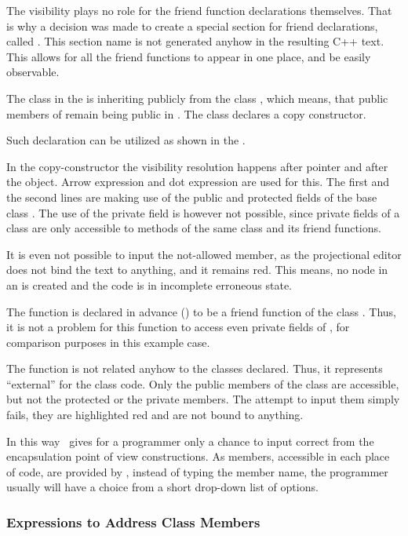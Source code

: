 The visibility plays no role for the friend function 
declarations themselves. That is why a decision was made to create a special 
section for friend declarations, called . This section name is not generated anyhow in the 
resulting C++ text. This allows for all the friend functions to appear in one place, 
and be easily observable.

The class  in the  is inheriting publicly from the class , which means,
that public members of  remain being public in . The class  declares
a copy constructor.

Such declaration can be utilized as shown in the .


In the copy-constructor the visibility resolution happens after  pointer
and after the  object. Arrow expression and dot expression are used for
this. The first and the second lines are making use of the public and protected fields of 
the base class . The use of the private field is however not possible, since
private fields of a class are only accessible to methods of the same class and its
friend functions. 

It is even not possible to input the not-allowed member, as the projectional editor
does not bind the text to anything, and it remains red. This means, no node in an 
is created and the code is in incomplete erroneous state.


The  function is declared in advance () to be a friend 
function of the class . Thus, it is not a problem for this function to access
even private fields of , for comparison purposes in this example case.

The function  is not related anyhow to the classes declared. Thus,
it represents ``external'' for the class  code. Only the public members of the class
are accessible, but not the protected or the private members. The attempt to input them simply
fails, they are highlighted red and are not bound to anything.

In this way \pcpp\ gives for a programmer only a chance to input correct from the encapsulation
point of view constructions. As members, accessible in each place of code, are provided by  
\pcpp, instead of typing the member name, the programmer usually will have a choice from a short drop-down
list of options.

\subsubsection{Expressions to Address Class Members}

